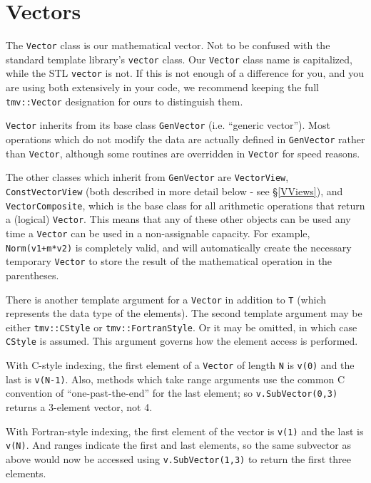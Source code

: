 \documentclass[twoside,letterpaper,11pt]{article}
\renewcommand{\tt}[1]{{\texttt {#1}}}
\begin{document}
\newpage
\section{Vectors}

The \tt{Vector} class is our mathematical vector.  Not to be confused with
the standard template library's \tt{vector} class.  
Our \tt{Vector} class name is capitalized, while the STL \tt{vector} is not.
If this is not enough of a difference for you, and you are using both extensively in your code,
we recommend keeping the full \tt{tmv::Vector} designation for ours to distinguish them.

\tt{Vector} inherits from its base class \tt{GenVector} (i.e. ``generic vector'').
Most operations which do not 
modify the data are actually defined in \tt{GenVector} rather than \tt{Vector}, although
some routines are overridden in \tt{Vector} for speed reasons.  

The other classes which inherit from \tt{GenVector} are \tt{VectorView}, 
\tt{ConstVectorView} (both described in more detail below - see \S\ref{VViews}), and
\tt{VectorComposite}, which is the base class for all arithmetic operations that
return a (logical) \tt{Vector}.  This means that any of these other objects can be used
any time a \tt{Vector} can be used in a non-assignable capacity.  For example,
\tt{Norm(v1+m*v2)} is completely valid, and will automatically create the necessary
temporary \tt{Vector} to store the result of the mathematical operation in the parentheses.

There is another template argument for a \tt{Vector} in addition to \tt{T} (which
represents the data type of the elements).  The second template argument
may be either \tt{tmv::CStyle} or \tt{tmv::FortranStyle}.  Or it may be omitted,
in which case \tt{CStyle} is assumed.  This argument governs how the element
access is performed.

With C-style indexing, the first element of a \tt{Vector} of length \tt{N} is 
\tt{v(0)} and the last is \tt{v(N-1)}.  Also, methods which take range arguments
use the common C convention of ``one-past-the-end'' for the last element;
so \tt{v.SubVector(0,3)} returns a 3-element vector, not 4.

With Fortran-style indexing, the first element of the vector is \tt{v(1)} and the 
last is \tt{v(N)}.  And ranges indicate the first and last elements, so the same
subvector as above would now be accessed using \tt{v.SubVector(1,3)} to return
the first three elements.
\end{document}
